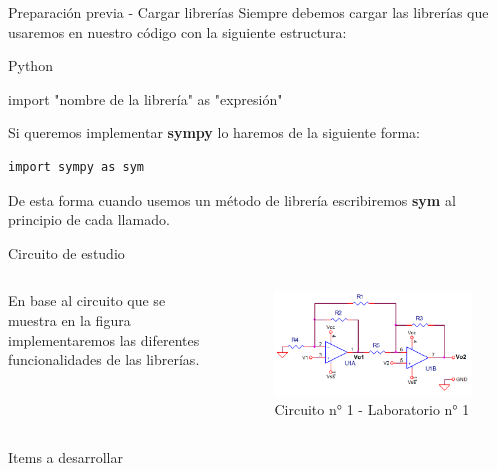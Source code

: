 \documentclass[14pt, aspectratio= 169]{beamer}
\begin{document}
\begin{frame}[fragile]{Preparación previa - Cargar librerías}
Siempre debemos cargar las librerías que usaremos en nuestro código con la siguiente estructura:
\begin{block}{Python}
\begin{semiverbatim}
import "nombre de la librería" as "expresión"
\end{semiverbatim}    
\end{block}
Si queremos implementar \textbf{sympy} lo haremos de la siguiente forma:
\begin{lstlisting}[style=python]
import sympy as sym
\end{lstlisting}
De esta forma cuando usemos un método de librería escribiremos \textbf{sym} al principio de cada llamado.
\end{frame}

\begin{frame}{Circuito de estudio}
    \begin{columns}
         En base al circuito que se muestra en la figura implementaremos las diferentes funcionalidades de las librerías.
\begin{figure}
        \centering
        \includegraphics[width=1.0\linewidth]{img/Circuito 1.png}
        \caption{Circuito n° 1 - Laboratorio n° 1}
        \label{fig:enter-label}
    \end{figure}
        \end{columns}
\end{frame}


\begin{frame}{Items a desarrollar}
\tableofcontents
\end{frame}
\end{document}

